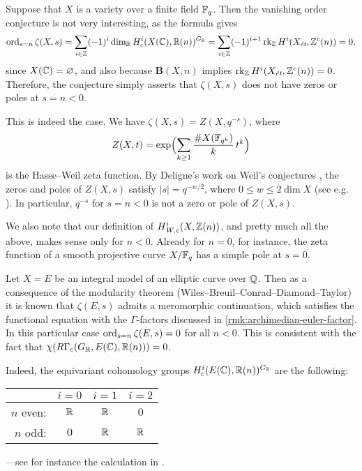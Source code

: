 \documentclass{article}
\numberwithin{equation}{section}
\begin{document}
\begin{example}
  Suppose that $X$ is a variety over a finite field $\FF_q$. Then the vanishing
  order conjecture is not very interesting, as the formula gives
  \[ \ord_{s=n} \zeta (X,s) =
    \sum_{i \in \ZZ} (-1)^i \dim_\RR H^i_c (X(\CC), \RR (n))^{G_\RR} =
    \sum_{i \in \ZZ} (-1)^{i+1} \rk_\ZZ H^i (X_\et, \ZZ^c (n)) = 0, \]
  since $X (\CC) = \emptyset$, and also because $\mathbf{B} (X,n)$ implies
  $\rk_\ZZ H^i (X_\et, \ZZ^c (n)) = 0$. Therefore, the conjecture simply asserts
  that $\zeta (X,s)$ does not have zeros or poles at $s = n < 0$.

  This is indeed the case. We have $\zeta (X,s) = Z (X,q^{-s})$, where
  $$Z (X,t) = \exp \Bigl(\sum_{k\ge 1} \frac{\# X (\FF_{q^k})}{k}\,t^k\Bigr)$$
  is the Hasse--Weil zeta function. By Deligne's work on Weil's conjectures
  \cite{Deligne-Weil-II}, the zeros and poles of $Z (X,s)$ satisfy
  $|s| = q^{-w/2}$, where $0 \le w \le 2 \dim X$ (see
  e.g. \cite[pp.\,26--27]{Katz-1994}). In particular, $q^{-s}$ for $s = n < 0$
  is not a zero or pole of $Z (X,s)$.

  We also note that our definition of $H^i_\Wc (X, \ZZ(n))$, and pretty much all
  the above, makes sense only for $n < 0$. Already for $n = 0$, for instance,
  the zeta function of a smooth projective curve $X/\FF_q$ has a simple pole
  at $s = 0$.
\end{example}

\begin{example}
  Let $X = E$ be an integral model of an elliptic curve over $\QQ$. Then as a
  consequence of the modularity theorem (Wiles--Breuil--Conrad--Diamond--Taylor)
  it is known that $\zeta (E,s)$ admits a meromorphic continuation, which
  satisfies the functional equation with the $\Gamma$-factors discussed in
  \ref{rmk:archimedian-euler-factor}. In this particular case
  $\ord_{s=n} \zeta (E,s) = 0$ for all $n < 0$. This is consistent with the fact
  that $\chi (R\Gamma_c (G_\RR, E (\CC), \RR (n))) = 0$.

  Indeed, the equivariant cohomology groups $H^i_c (E (\CC), \RR (n))^{G_\RR}$
  are the following:
  \begin{center}
    \renewcommand{\arraystretch}{1.5}
    \begin{tabular}{rccc}
      \hline
      & $i = 0$ & $i = 1$ & $i = 2$ \\
      \hline
      $n$ even: & $\RR$ & $\RR$ & $0$ \\
      $n$ odd: & $0$ & $\RR$ & $\RR$ \\
      \hline
    \end{tabular}
  \end{center}
  ---see for instance the calculation in \cite[Lemma~A.6]{Siebel-2019}.
\end{example}
\end{document}
